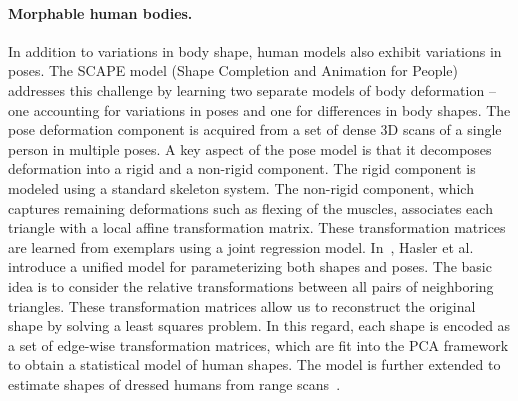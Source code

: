 


\paragraph*{Morphable human bodies.} 

In addition to variations in body shape, human models also exhibit variations in poses.  The SCAPE model (Shape Completion and Animation for People)~\cite{SCAPE:2005} addresses this challenge by learning two separate models of body deformation -- one accounting for variations in poses and one for differences in body shapes. The pose deformation component is acquired from a set of dense 3D scans of a single person in multiple poses. A key aspect of the pose model is that it decomposes deformation into a rigid and a non-rigid component. The rigid component is modeled using a standard skeleton system. The non-rigid component, which captures remaining deformations such as flexing of the muscles, associates each triangle with a local affine transformation matrix. These transformation matrices are learned from exemplars using a joint regression model. %
%
In~\cite{Hasler:2009:SSR}, Hasler et al. introduce a unified model for parameterizing both shapes and poses. The basic idea is to consider the relative transformations between all pairs of neighboring triangles. These transformation matrices allow us to reconstruct the original shape by solving a least squares problem. In this regard, each shape is encoded as a set of edge-wise transformation matrices, which are fit into the PCA framework to obtain a statistical model of human shapes. The model is further extended to estimate shapes of dressed humans from range scans~\cite{Hasler:2009:TSE}.

